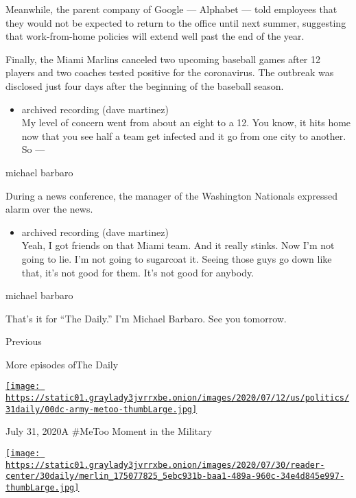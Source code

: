 Meanwhile, the parent company of Google --- Alphabet --- told employees
that they would not be expected to return to the office until next
summer, suggesting that work-from-home policies will extend well past
the end of the year.

Finally, the Miami Marlins canceled two upcoming baseball games after 12
players and two coaches tested positive for the coronavirus. The
outbreak was disclosed just four days after the beginning of the
baseball season.

\begin{itemize}
\tightlist
\item
  archived recording (dave martinez)\\
  My level of concern went from about an eight to a 12. You know, it
  hits home now that you see half a team get infected and it go from one
  city to another. So ---
\end{itemize}

michael barbaro

During a news conference, the manager of the Washington Nationals
expressed alarm over the news.

\begin{itemize}
\tightlist
\item
  archived recording (dave martinez)\\
  Yeah, I got friends on that Miami team. And it really stinks. Now I'm
  not going to lie. I'm not going to sugarcoat it. Seeing those guys go
  down like that, it's not good for them. It's not good for anybody.
\end{itemize}

michael barbaro

That's it for ``The Daily.'' I'm Michael Barbaro. See you tomorrow.

Previous

More episodes ofThe Daily

\href{https://www.nytimes3xbfgragh.onion/2020/07/31/podcasts/the-daily/vanessa-guillen-military-metoo.html?action=click\&module=audio-series-bar\&region=header\&pgtype=Article}{\texttt{[image: https://static01.graylady3jvrrxbe.onion/images/2020/07/12/us/politics/31daily/00dc-army-metoo-thumbLarge.jpg]}}

July 31, 2020A \#MeToo Moment in the Military

\href{https://www.nytimes3xbfgragh.onion/2020/07/30/podcasts/the-daily/congress-facebook-amazon-google-apple.html?action=click\&module=audio-series-bar\&region=header\&pgtype=Article}{\texttt{[image: https://static01.graylady3jvrrxbe.onion/images/2020/07/30/reader-center/30daily/merlin\_175077825\_5ebc931b-baa1-489a-960c-34e4d845e997-thumbLarge.jpg]}}

